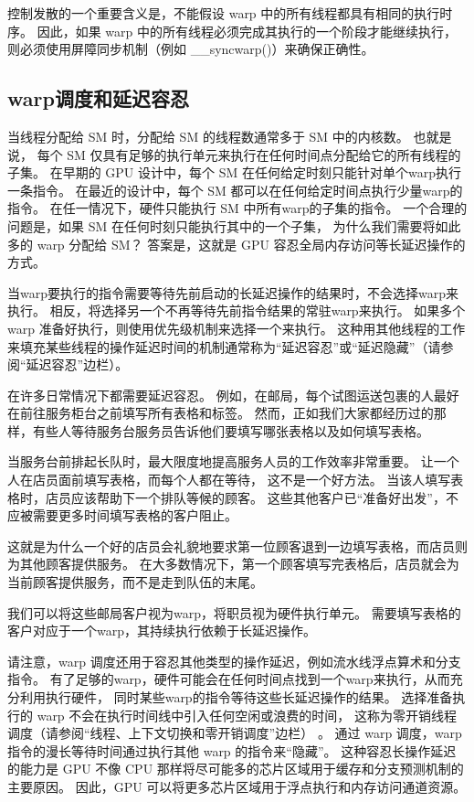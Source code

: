 控制发散的一个重要含义是，不能假设 warp 中的所有线程都具有相同的执行时序。 
因此，如果 warp 中的所有线程必须完成其执行的一个阶段才能继续执行，
则必须使用屏障同步机制（例如 \_\_syncwarp()）来确保正确性。

\subsection{warp调度和延迟容忍}
当线程分配给 SM 时，分配给 SM 的线程数通常多于 SM 中的内核数。 也就是说，
每个 SM 仅具有足够的执行单元来执行在任何时间点分配给它的所有线程的子集。 
在早期的 GPU 设计中，每个 SM 在任何给定时刻只能针对单个warp执行一条指令。 
在最近的设计中，每个 SM 都可以在任何给定时间点执行少量warp的指令。 
在任一情况下，硬件只能执行 SM 中所有warp的子集的指令。 一个合理的问题是，如果 SM 在任何时刻只能执行其中的一个子集，
为什么我们需要将如此多的 warp 分配给 SM？ 答案是，这就是 GPU 容忍全局内存访问等长延迟操作的方式。

当warp要执行的指令需要等待先前启动的长延迟操作的结果时，不会选择warp来执行。 
相反，将选择另一个不再等待先前指令结果的常驻warp来执行。 如果多个 warp 准备好执行，则使用优先级机制来选择一个来执行。 
这种用其他线程的工作来填充某些线程的操作延迟时间的机制通常称为“延迟容忍”或“延迟隐藏”（请参阅“延迟容忍”边栏）。

\begin{remark}[延迟容忍]
在许多日常情况下都需要延迟容忍。 例如，在邮局，每个试图运送包裹的人最好在前往服务柜台之前填写所有表格和标签。 
然而，正如我们大家都经历过的那样，有些人等待服务台服务员告诉他们要填写哪张表格以及如何填写表格。

当服务台前排起长队时，最大限度地提高服务人员的工作效率非常重要。 让一个人在店员面前填写表格，而每个人都在等待，
这不是一个好方法。 当该人填写表格时，店员应该帮助下一个排队等候的顾客。 
这些其他客户已“准备好出发”，不应被需要更多时间填写表格的客户阻止。

这就是为什么一个好的店员会礼貌地要求第一位顾客退到一边填写表格，而店员则为其他顾客提供服务。 
在大多数情况下，第一个顾客填写完表格后，店员就会为当前顾客提供服务，而不是走到队伍的末尾。

我们可以将这些邮局客户视为warp，将职员视为硬件执行单元。 
需要填写表格的客户对应于一个warp，其持续执行依赖于长延迟操作。
\end{remark}

请注意，warp 调度还用于容忍其他类型的操作延迟，例如流水线浮点算术和分支指令。 
有了足够的warp，硬件可能会在任何时间点找到一个warp来执行，从而充分利用执行硬件，
同时某些warp的指令等待这些长延迟操作的结果。 选择准备执行的 warp 不会在执行时间线中引入任何空闲或浪费的时间，
这称为零开销线程调度（请参阅“线程、上下文切换和零开销调度”边栏） 。 
通过 warp 调度，warp 指令的漫长等待时间通过执行其他 warp 的指令来“隐藏”。 
这种容忍长操作延迟的能力是 GPU 不像 CPU 那样将尽可能多的芯片区域用于缓存和分支预测机制的主要原因。 
因此，GPU 可以将更多芯片区域用于浮点执行和内存访问通道资源。

